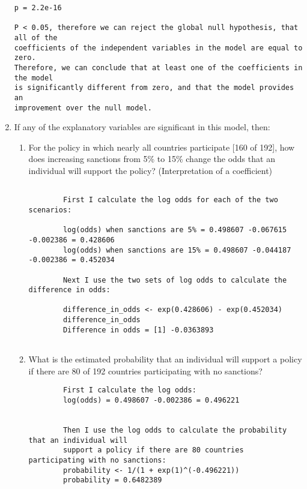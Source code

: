 \documentclass[12pt,letterpaper]{article}
\begin{document}
\begin{enumerate}
\begin{verbatim}
p = 2.2e-16

P < 0.05, therefore we can reject the global null hypothesis, that all of the
coefficients of the independent variables in the model are equal to zero.
Therefore, we can conclude that at least one of the coefficients in the model
is significantly different from zero, and that the model provides an
improvement over the null model.

	\end{verbatim}
	
	\item
	If any of the explanatory variables are significant in this model, then:
	\begin{enumerate}
		\item
		For the policy in which nearly all countries participate [160 of 192], how does increasing sanctions from 5\% to 15\% change the odds that an individual will support the policy? (Interpretation of a coefficient)
		
	\begin{verbatim}	
		
		First I calculate the log odds for each of the two scenarios:
		
		log(odds) when sanctions are 5% = 0.498607 -0.067615 -0.002386 = 0.428606
		log(odds) when sanctions are 15% = 0.498607 -0.044187 -0.002386 = 0.452034
		
		Next I use the two sets of log odds to calculate the difference in odds:
		
		difference_in_odds <- exp(0.428606) - exp(0.452034)
		difference_in_odds
		Difference in odds = [1] -0.0363893
	
	\end{verbatim}		
		
		\item
		What is the estimated probability that an individual will support a policy if there are 80 of 192 countries participating with no sanctions? 
		
		\begin{verbatim}	
		First I calculate the log odds:	
		log(odds) = 0.498607 -0.002386 = 0.496221
		
		
		Then I use the log odds to calculate the probability that an individual will
		support a policy if there are 80 countries participating with no sanctions:
		probability <- 1/(1 + exp(1)^(-0.496221))
		probability = 0.6482389
		

\end{verbatim}
\end{enumerate}
\end{enumerate}
\end{document}
